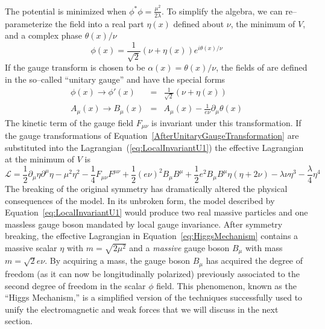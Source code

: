 The potential is minimized when $\phi^*\phi = \frac{\mu^2}{2\lambda}$.  To
simplify the algebra, we can
re--parameterize the field into a real part $\eta(x)$ defined about $\nu$, the minimum of $V$, 
and a complex phase $\theta(x)/\nu$
\begin{equation}
  \phi(x) = \frac{1}{\sqrt 2}(\nu + \eta(x))e^{i \theta(x)/\nu}
  \label{eq:HiggsMechanismFieldParameterization}
\end{equation}
If the gauge transform is chosen to be $\alpha(x) = \theta(x)/\nu$, the fields
of are defined in the
so--called ``unitary gauge'' and have the special forms
\begin{eqnarray}
  \phi(x) \to \phi'(x) &=& \frac{1}{\sqrt 2}(\nu + \eta(x)) \nonumber \\
  A_\mu(x) \to B_\mu(x) &=& A_\mu(x) - \frac{1}{e \nu}\partial_\mu \theta(x)
  \label{eq:AfterUnitaryGaugeTransformation}
\end{eqnarray}
The kinetic term of the gauge field $F_{\mu\nu}$ is invariant under this
transformation.  If the gauge transformations of
Equation~\ref{AfterUnitaryGaugeTransformation} are substituted into the
Lagrangian~(\ref{eq:LocalInvariantU1}) the effective Lagrangian at the minimum
of $V$ is
\begin{equation}
  \mathcal{L} = \frac{1}{2} \partial_\mu \eta \partial^\mu \eta -
  \mu^2 \eta^2 
  - \frac{1}{4} F_{\mu\nu} F^{\mu\nu} + \frac{1}{2} (e\nu)^2 B_\mu B^\mu 
  + \frac{1}{2} e^2 B_\mu B^\mu \eta (\eta + 2 \nu) - \lambda \nu \eta^3 -
  \frac{\lambda }{4}\eta^4
  \label{eq:HiggsMechanism}
\end{equation}
The breaking of the original symmetry has dramatically altered the physical
consequences of the model.  In its unbroken form, the model described by
Equation~\ref{eq:LocalInvariantU1} would produce two real massive particles and
one massless gauge boson mandated by local gauge invariance.  After symmetry
breaking, the effective Lagrangian in Equation~\ref{eq:HiggsMechanism} contains
a massive scalar $\eta$ with $m = \sqrt{2\mu^2}$ and a \emph{massive} gauge
boson $B_\mu$ with mass $m = \sqrt 2 e\nu$.  By acquiring a mass, the gauge
boson $B_\mu$ has acquired the degree of freedom (as it can now be
longitudinally polarized) previously associated to the second degree of freedom
in the scalar $\phi$ field.  This phenomenon, known as the ``Higgs Mechanism,''
is a simplified version of the techniques successfully used to unify the
electromagnetic and weak forces that we will discuss in the next section.  

